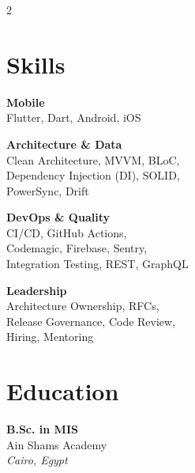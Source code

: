 \documentclass[10pt,a4paper]{article}
\begin{document}
    \begin{paracol}{2}


        \section{Skills}\label{sec:skills}

        \textbf{Mobile} \\
        Flutter, Dart, Android, iOS

        \vspace{3pt}

        \textbf{Architecture \& Data} \\
        Clean Architecture, MVVM, BLoC, \\
        Dependency Injection (DI), SOLID, \\
        PowerSync, Drift

        \vspace{3pt}

        \textbf{DevOps \& Quality} \\
        CI/CD, GitHub Actions, \\
        Codemagic, Firebase, Sentry, \\
        Integration Testing, REST, GraphQL

        \vspace{3pt}

        \textbf{Leadership} \\
        Architecture Ownership, RFCs, \\
        Release Governance, Code Review, \\
        Hiring, Mentoring

        \vspace{3pt}


        \section{Education}\label{sec:education}
        \textbf{B.Sc. in MIS}\\
        Ain Shams Academy \\
        \textit{Cairo, Egypt}

        \vspace{3pt}



\end{paracol}
\end{document}
